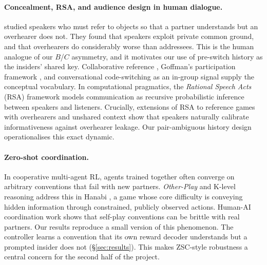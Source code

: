 \documentclass[10pt,a4paper,twocolumn]{article}
\newcommand{\1}{\mathbb{1}}
\begin{document}
\paragraph{Concealment, RSA, and audience design in human dialogue.}
\citet{clark1987concealing} studied speakers who must refer to objects so that a partner understands but an overhearer does not. They found that speakers exploit private common ground, and that overhearers do considerably worse than addressees. This is the human analogue of our $B$/$C$ asymmetry, and it motivates our use of pre-switch history as the insiders' shared key. Collaborative reference \citep{clark1986referring}, Goffman's participation framework \citep{goffman1981forms}, and conversational code-switching as an in-group signal \citep{gumperz1982discourse} supply the conceptual vocabulary. In computational pragmatics, the \emph{Rational Speech Acts} (RSA) framework \citep{frank2012predicting,goodman2016pragmatic} models communication as recursive probabilistic inference between speakers and listeners. Crucially, extensions of RSA to reference games with overhearers and unshared context \citep{cohngordon2018pragmatically,hawkins2020continual} show that speakers naturally calibrate informativeness against overhearer leakage. Our pair-ambiguous history design operationalises this exact dynamic.

\paragraph{Zero-shot coordination.}
In cooperative multi-agent RL, agents trained together often converge on arbitrary conventions that fail with new partners. \emph{Other-Play} \citep{hu2020otherplay} and K-level reasoning \citep{cui2021klevel} address this in Hanabi \citep{bard2020hanabi}, a game whose core difficulty is conveying hidden information through constrained, publicly observed actions. Human-AI coordination work \citep{carroll2019utility,strouse2021fcp} shows that self-play conventions can be brittle with real partners. Our results reproduce a small version of this phenomenon. The controller learns a convention that its own reward decoder understands but a prompted insider does not (\S\ref{sec:results}). This makes ZSC-style robustness a central concern for the second half of the project.
\end{document}
